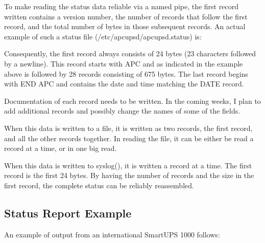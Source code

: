 {{{{{{{{To make reading the status data reliable via a named pipe, the first record
written contains a version number, the number of records that follow the first
record, and the total number of bytes in those subsequent records. An actual
example of such a status file (/etc/apcupsd/apcupsd.status) is:  

Consequently, the first record always consists of 24 bytes (23 characters
followed by a newline). This record starts with APC and as indicated in the
example above is followed by 28 records consisting of 675 bytes. The last
record begins with END APC and contains the date and time matching the DATE
record.  

Documentation of each record needs to be written. In the coming weeks, I plan
to add additional records and possibly change the names of some of the fields.
 

When this data is written to a file, it is written as two records, the first
record, and all the other records together. In reading the file, it can be
either be read a record at a time, or in one big read.  

When this data is written to syslog(), it is written a record at a time. The
first record is the first 24 bytes. By having the number of records and the
size in the first record, the complete status can be reliably reassembled. 

\label{Status-Report-Example}

\subsection*{Status Report Example}

\label{index-Examples_002c-Status-Report-254}
\label{index-Status-255}
An example of output from an international SmartUPS 1000 follows: 

}}}}}}}}
